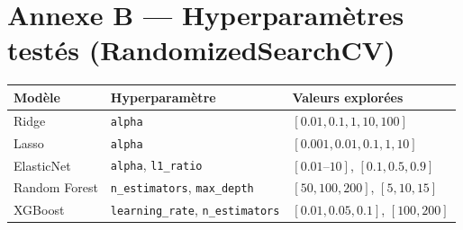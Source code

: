 \newpage

\section*{Annexe B — Hyperparamètres testés (RandomizedSearchCV)}

\begin{longtable}{@{}lll@{}}
\toprule
\textbf{Modèle} & \textbf{Hyperparamètre} & \textbf{Valeurs explorées} \\
\midrule
Ridge         & \texttt{alpha}                  & $[0.01, 0.1, 1, 10, 100]$ \\
Lasso         & \texttt{alpha}                  & $[0.001, 0.01, 0.1, 1, 10]$ \\
ElasticNet    & \texttt{alpha}, \texttt{l1\_ratio} & $[0.01\text{--}10]$, $[0.1, 0.5, 0.9]$ \\
Random Forest & \texttt{n\_estimators}, \texttt{max\_depth} & $[50, 100, 200]$, $[5, 10, 15]$ \\
XGBoost       & \texttt{learning\_rate}, \texttt{n\_estimators} & $[0.01, 0.05, 0.1]$, $[100, 200]$ \\
\bottomrule
\end{longtable}

\newpage
